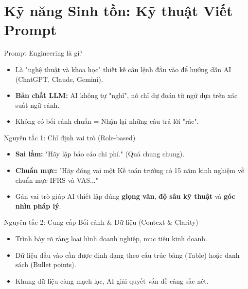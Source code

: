 \documentclass[aspectratio=169,12pt]{beamer}
\begin{document}
\section{Kỹ năng Sinh tồn: Kỹ thuật Viết Prompt}
\begin{frame}
    \tableofcontents[currentsection]
\end{frame}

\begin{frame}{Prompt Engineering là gì?}
    \begin{itemize}
        \item Là "nghệ thuật và khoa học" thiết kế câu lệnh đầu vào để hướng dẫn AI (ChatGPT, Claude, Gemini).
        \item \textbf{Bản chất LLM:} AI không tự "nghĩ", nó chỉ dự đoán từ ngữ dựa trên xác suất ngữ cảnh.
        \item Không có bối cảnh chuẩn = Nhận lại những câu trả lời "rác".
    \end{itemize}
\end{frame}

\begin{frame}{Nguyên tắc 1: Chỉ định vai trò (Role-based)}
    \begin{itemize}
        \item \textbf{Sai lầm:} "Hãy lập báo cáo chi phí." (Quá chung chung).
        \item \textbf{Chuẩn mực:} "Hãy đóng vai một Kế toán trưởng có 15 năm kinh nghiệm về chuẩn mực IFRS và VAS..."
        \item Gán vai trò giúp AI thiết lập đúng \textbf{giọng văn}, \textbf{độ sâu kỹ thuật} và \textbf{góc nhìn pháp lý}.
    \end{itemize}
\end{frame}

\begin{frame}{Nguyên tắc 2: Cung cấp Bối cảnh \& Dữ liệu (Context \& Clarity)}
    \begin{itemize}
        \item Trình bày rõ ràng loại hình doanh nghiệp, mục tiêu kinh doanh.
        \item Dữ liệu đầu vào cần được định dạng theo cấu trúc bảng (Table) hoặc danh sách (Bullet points).
        \item Khung dữ liệu càng mạch lạc, AI giải quyết vấn đề càng sắc nét.
    \end{itemize}
\end{frame}
\end{document}
